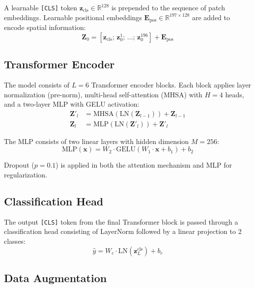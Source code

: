\documentclass[10pt,twocolumn,letterpaper]{article}
\begin{document}
A learnable \texttt{[CLS]} token $\mathbf{z}_{\text{cls}} \in \mathbb{R}^{128}$ is prepended to the sequence of patch embeddings. Learnable positional embeddings $\mathbf{E}_{\text{pos}} \in \mathbb{R}^{197 \times 128}$ are added to encode spatial information:
\begin{equation}
    \mathbf{Z}_0 = [\mathbf{z}_{\text{cls}}; \, \mathbf{z}_0^1; \, \ldots; \, \mathbf{z}_0^{196}] + \mathbf{E}_{\text{pos}}
\end{equation}

\subsection{Transformer Encoder}

The model consists of $L=6$ Transformer encoder blocks. Each block applies layer normalization (pre-norm), multi-head self-attention (MHSA) with $H=4$ heads, and a two-layer MLP with GELU activation:
\begin{align}
    \mathbf{Z}'_l &= \text{MHSA}(\text{LN}(\mathbf{Z}_{l-1})) + \mathbf{Z}_{l-1} \\
    \mathbf{Z}_l &= \text{MLP}(\text{LN}(\mathbf{Z}'_l)) + \mathbf{Z}'_l
\end{align}

The MLP consists of two linear layers with hidden dimension $M=256$:
\begin{equation}
    \text{MLP}(\mathbf{x}) = W_2 \cdot \text{GELU}(W_1 \cdot \mathbf{x} + b_1) + b_2
\end{equation}

Dropout ($p=0.1$) is applied in both the attention mechanism and MLP for regularization.

\subsection{Classification Head}

The output \texttt{[CLS]} token from the final Transformer block is passed through a classification head consisting of LayerNorm followed by a linear projection to 2 classes:
\begin{equation}
    \hat{y} = W_c \cdot \text{LN}(\mathbf{z}_L^{\text{cls}}) + b_c
\end{equation}

\subsection{Data Augmentation}
\label{sec:augmentation}
\end{document}
